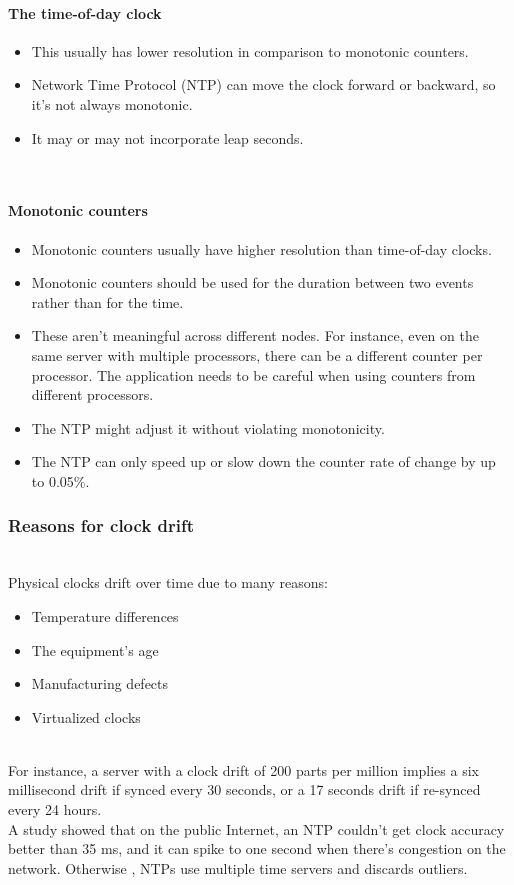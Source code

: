 \paragraph{The time-of-day clock}\label{the-time-of-day-clock}

\begin{itemize}
\tightlist
\item
This usually has lower resolution in comparison to monotonic counters.
\item
Network Time Protocol (NTP) can move the clock forward or backward, so it's not always monotonic.
\item
It may or may not incorporate leap seconds.
\end{itemize}
\\
\paragraph{Monotonic counters}\label{monotonic-counters}

\begin{itemize}
\tightlist
\item
Monotonic counters usually have higher resolution than time-of-day clocks.
\item
Monotonic counters should be used for the duration between two events rather than for the time.
\item
These aren't meaningful across different nodes. For instance, even on the same server with multiple processors, there can be a different counter per processor. The application needs to be careful when using counters from different processors.
\item
The NTP might adjust it without violating monotonicity.
\item
The NTP can only speed up or slow down the counter rate of change by up to 0.05\%.
\end{itemize}

\subsubsection{Reasons for clock drift}\label{reasons-for-clock-drift}
\\
Physical clocks drift over time due to many reasons:

\begin{itemize}
\tightlist
\item
Temperature differences
\item
The equipment's age
\item
Manufacturing defects
\item
Virtualized clocks
\end{itemize}
\\
For instance, a server with a clock drift of 200 parts per million implies a six millisecond drift if synced every 30 seconds, or a 17 seconds drift if re-synced every 24 hours.
\\
A study showed that on the public Internet, an NTP couldn't get clock accuracy better than 35 ms, and it can spike to one second when there's congestion on the network. Otherwise , NTPs use multiple time servers and discards outliers.

